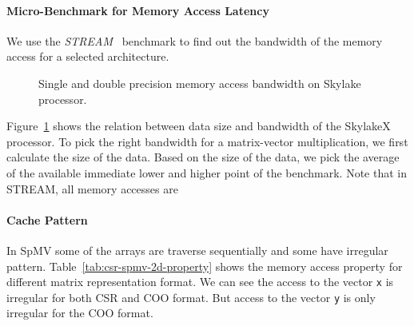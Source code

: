 \documentclass[conference, 10ppt]{IEEEtran}
\begin{document}
\paragraph{Micro-Benchmark for Memory Access Latency}
We use the \textit{STREAM}~\cite{mccalpin1995stream} benchmark to find
out the bandwidth of the memory access for a selected architecture.

\begin{figure}[hbt!]
	\centering
	\caption{Single and double precision memory access bandwidth on Skylake processor.}
	\label{fig:stream-copy-bandwidth}
\end{figure}

Figure~\ref{fig:stream-copy-bandwidth} shows the relation between data
size and bandwidth of the SkylakeX processor. To pick the right
bandwidth for a matrix-vector multiplication, we first calculate the
size of the data. Based on the size of the data, we pick the average
of the available immediate lower and higher point of the
benchmark. Note that in STREAM, all memory accesses are 
 
\paragraph{Cache Pattern}
In SpMV some of the arrays are traverse sequentially and some have irregular
pattern. Table~\ref{tab:csr-spmv-2d-property} shows the memory access
property for different matrix representation format. We can see the
access to the vector \texttt{x} is irregular for both CSR and COO
format. But access to the vector \texttt{y} is only irregular for the
COO format.
\end{document}
